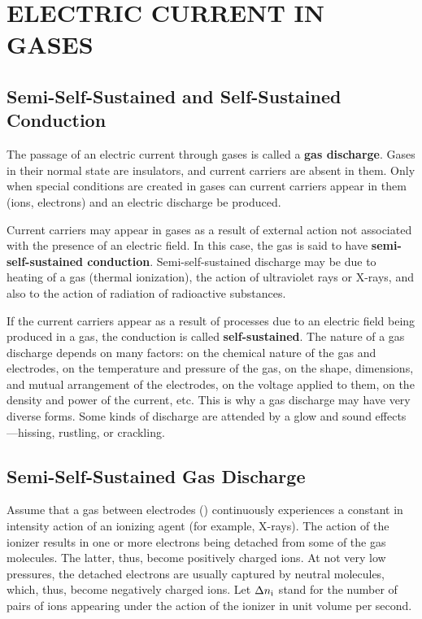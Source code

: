 

\chapter[ELECTRIC CURRENT IN GASES]{ELECTRIC CURRENT
IN GASES}\label{chap:12}

\section{Semi-Self-Sustained and Self-Sustained Conduction}\label{sec:12_1}

The passage of an electric current through gases is called a \textbf{gas discharge}.
Gases in their normal state are insulators, and current carriers are absent in them.
Only when special conditions are created in gases can current carriers appear in them (ions, electrons) and an electric discharge be produced.

Current carriers may appear in gases as a result of external action not associated with the presence of an electric field.
In this case, the gas is said to have \textbf{semi-self-sustained conduction}.
Semi-self-sustained discharge may be due to heating of a gas (thermal ionization), the action of ultraviolet rays or X-rays, and also to the action of radiation of radioactive substances.

If the current carriers appear as a result of processes due to an electric field being produced in a gas, the conduction is called \textbf{self-sustained}.
The nature of a gas discharge depends on many factors: on the chemical nature of the gas and electrodes, on the temperature and pressure of the gas, on the shape, dimensions, and mutual arrangement
of the electrodes, on the voltage applied to them, on the density and power of the current, etc.
This is why a gas discharge may have very diverse forms.
Some kinds of discharge are attended by a glow and sound effects---hissing, rustling, or crackling.

\section{Semi-Self-Sustained Gas Discharge}\label{sec:12_2}

Assume that a gas between electrodes () continuously experiences a constant in intensity action of an ionizing agent (for example, X-rays).
The action of the ionizer results in one or more electrons being detached from some of the gas molecules.
The latter, thus, become positively charged ions.
At not very low pressures, the detached electrons are usually captured by neutral molecules, which, thus, become negatively charged ions.
Let $\Delta{n_{\text{i}}}$ stand for the number of pairs of ions appearing under the action of the ionizer in unit volume per second.

